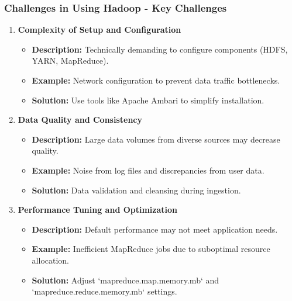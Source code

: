\documentclass[aspectratio=169]{beamer}
\begin{document}
\begin{frame}[fragile]
    \frametitle{Challenges in Using Hadoop - Key Challenges}
    \begin{enumerate}
        \item \textbf{Complexity of Setup and Configuration}
            \begin{itemize}
                \item \textbf{Description:} Technically demanding to configure components (HDFS, YARN, MapReduce).
                \item \textbf{Example:} Network configuration to prevent data traffic bottlenecks.
                \item \textbf{Solution:} Use tools like Apache Ambari to simplify installation.
            \end{itemize}
        
        \item \textbf{Data Quality and Consistency}
            \begin{itemize}
                \item \textbf{Description:} Large data volumes from diverse sources may decrease quality.
                \item \textbf{Example:} Noise from log files and discrepancies from user data.
                \item \textbf{Solution:} Data validation and cleansing during ingestion.
            \end{itemize}
        
        \item \textbf{Performance Tuning and Optimization}
            \begin{itemize}
                \item \textbf{Description:} Default performance may not meet application needs.
                \item \textbf{Example:} Inefficient MapReduce jobs due to suboptimal resource allocation.
                \item \textbf{Solution:} Adjust `mapreduce.map.memory.mb` and `mapreduce.reduce.memory.mb` settings.
            \end{itemize}
    \end{enumerate}
\end{frame}
\end{document}
